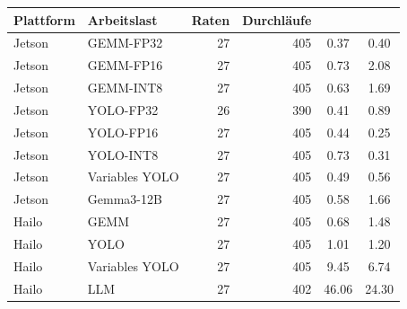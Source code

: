 \begin{tabular}{@{}llrrS[table-format=2.2]S[table-format=2.2]@{}}
\toprule
Plattform & Arbeitslast & Raten & Durchläufe & {} & {} \\
\midrule
Jetson & GEMM-FP32 & 27 & 405 & 0.37 & 0.40 \\
Jetson & GEMM-FP16 & 27 & 405 & 0.73 & 2.08 \\
Jetson & GEMM-INT8 & 27 & 405 & 0.63 & 1.69 \\
Jetson & YOLO-FP32 & 26 & 390 & 0.41 & 0.89 \\
Jetson & YOLO-FP16 & 27 & 405 & 0.44 & 0.25 \\
Jetson & YOLO-INT8 & 27 & 405 & 0.73 & 0.31 \\
Jetson & Variables YOLO & 27 & 405 & 0.49 & 0.56 \\
Jetson & Gemma3-12B & 27 & 405 & 0.58 & 1.66 \\
Hailo & GEMM & 27 & 405 & 0.68 & 1.48 \\
Hailo & YOLO & 27 & 405 & 1.01 & 1.20 \\
Hailo & Variables YOLO & 27 & 405 & 9.45 & 6.74 \\
Hailo & LLM & 27 & 402 & 46.06 & 24.30 \\
\bottomrule
\end{tabular}
